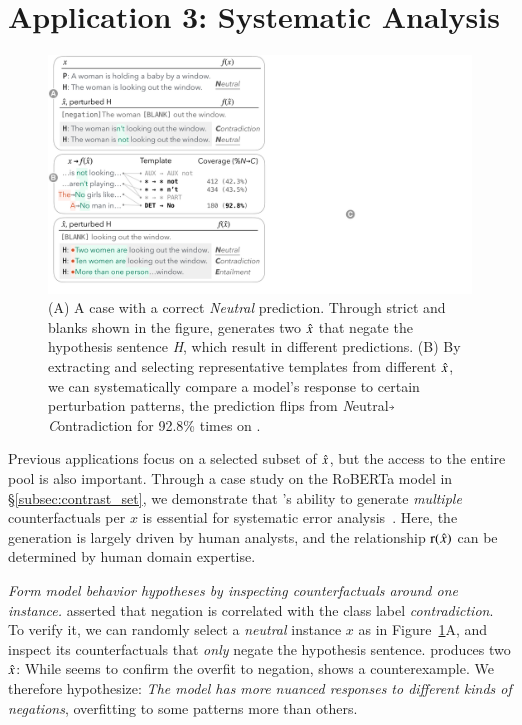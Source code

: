 \section{Application 3: Systematic Analysis}
\label{sec:app_err_analysis}


\begin{figure}[t]
\centering
\includegraphics[trim={0 12.5cm 33cm 0cm},clip,width=1\columnwidth]{figures/err_analysis.pdf}
\vspace{-15pt}
\caption{
(A) A \nli case with a correct \emph{Neutral} prediction.
Through strict \tagstrs and blanks shown in the figure, \sysname generates two $\hat{x}$ that negate the hypothesis sentence \emph{H}, which result in different predictions.
(B) By extracting and selecting representative templates from different $\hat{x}$, we can systematically compare a model's response to certain perturbation patterns, \eg the prediction flips from \emph{N}eutral$\veryshortarrow$\emph{C}ontradiction for 92.8\% times on .
}
\vspace{-10pt}
\label{fig:err_analysis}
\end{figure}


Previous applications focus on a selected subset of $\hat{x}$, but the access to the entire pool is also important.
Through a case study on the \nli RoBERTa model in \S\ref{subsec:contrast_set}, we demonstrate that \sysname's ability to generate \emph{multiple} counterfactuals per $x$ is essential for systematic error analysis~\cite{wu2019errudite}.
Here, the generation is largely driven by human analysts, and the relationship $\operatorname*{r}(\hat{x})$ can be determined by human domain expertise.


\emph{Form model behavior hypotheses by inspecting counterfactuals around one instance.}
\citet{gururangan2018annotation} asserted that negation is correlated with the class label \emph{contradiction}. 
To verify it, we can randomly select a \emph{neutral} instance $x$ as in Figure~\ref{fig:err_analysis}A, and inspect its counterfactuals that \emph{only} negate the hypothesis sentence.
\sysname produces two $\hat{x}$:
While  seems to confirm the overfit to negation,  shows a counterexample. 
We therefore hypothesize: 
\emph{The model has more nuanced responses to different kinds of negations}, overfitting to some patterns more than others.


